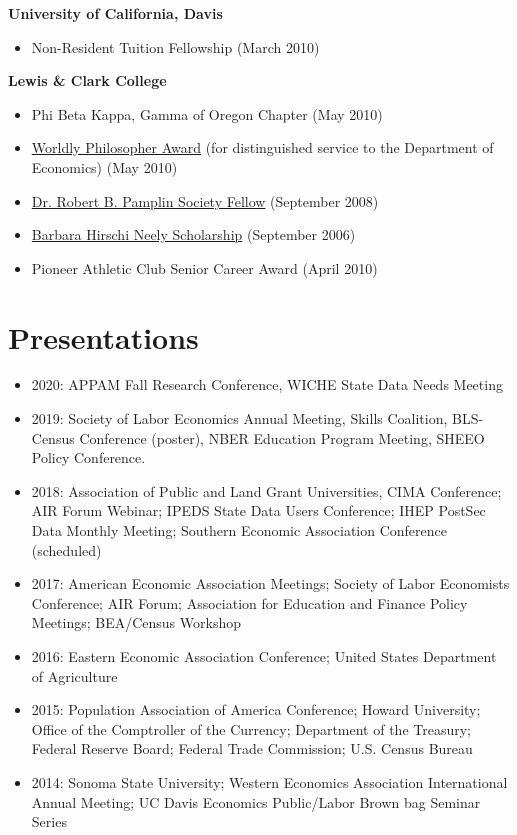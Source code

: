 \documentclass[margin,line]{res}
\begin{document}
\begin{resume}
\textbf{University of California, Davis}
\begin{itemize}
	 \setlength{\itemsep}{0cm}%
  \setlength{\parskip}{0cm}%
	\item Non-Resident Tuition Fellowship (March 2010)
\end{itemize}
\vspace*{-.1in}
\textbf{Lewis \& Clark College}
\begin{itemize}
	 \setlength{\itemsep}{0cm}%
  	\setlength{\parskip}{0cm}%
	\item Phi Beta Kappa, Gamma of Oregon Chapter (May 2010)
	\item \href{http://college.lclark.edu/departments/economics/news/}{Worldly Philosopher Award} (for distinguished service to the Department of Economics) (May 2010)
	\item \href{http://college.lclark.edu/academics/honors/pamplin_society/}{Dr. Robert B. Pamplin Society Fellow} (September 2008)
	\item \href{http://www.lclark.edu/offices/financial_aid/merit_scholarships/}{Barbara Hirschi Neely Scholarship} (September 2006)
	\item Pioneer Athletic Club Senior Career Award (April 2010)
\end{itemize}



\section{\sc Presentations}

\begin{itemize}
 \setlength{\itemsep}{0cm}%
  \setlength{\parskip}{0cm}%
	\item 2020: APPAM Fall Research Conference, WICHE State Data Needs Meeting
	\item 2019: Society of Labor Economics Annual Meeting, Skills Coalition, BLS-Census Conference (poster), NBER Education Program Meeting, SHEEO Policy Conference.
	\item 2018: Association of Public and Land Grant Universities, CIMA Conference; AIR Forum Webinar; IPEDS State Data Users Conference; IHEP PostSec Data Monthly Meeting; Southern Economic Association Conference (scheduled)
	\item 2017: American Economic Association Meetings; Society of Labor Economists Conference; AIR Forum; Association for Education and Finance Policy Meetings; BEA/Census Workshop
	\item 2016: Eastern Economic Association Conference; United States Department of Agriculture
	\item 2015: Population Association of America Conference; Howard University; Office of the Comptroller of the Currency; Department of the Treasury; Federal Reserve Board; Federal Trade Commission; U.S. Census Bureau
	\item 2014: Sonoma State University; Western Economics Association International Annual Meeting; UC Davis Economics Public/Labor Brown bag Seminar Series
\end{itemize}


\end{resume}
\end{document}
